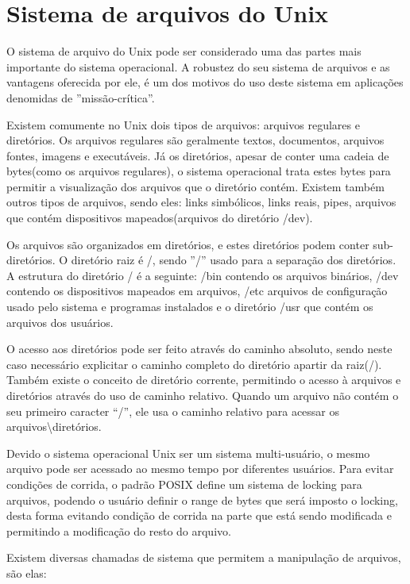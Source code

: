 \chapter{Sistema de arquivos do Unix}

O sistema de arquivo do Unix pode ser considerado uma das partes mais importante do sistema operacional. A robustez do seu sistema de arquivos e as vantagens oferecida por ele, é um dos motivos do uso deste sistema em aplicações denomidas de ''missão-crítica''.

Existem comumente no Unix dois tipos de arquivos: arquivos regulares e diretórios. Os arquivos regulares são geralmente textos, documentos, arquivos fontes, imagens e executáveis. Já os diretórios, apesar de conter uma cadeia de bytes(como os arquivos regulares),  o sistema operacional trata estes bytes para permitir a visualização dos arquivos que o diretório contém. Existem também outros tipos de arquivos, sendo eles: links simbólicos, links reais, pipes, arquivos que contém dispositivos mapeados(arquivos do diretório /dev).

Os arquivos são organizados em diretórios, e estes diretórios podem conter sub-diretórios. O diretório raiz é /, sendo ''/'' usado para a separação dos diretórios. A estrutura do diretório / é a seguinte: /bin contendo os arquivos binários, /dev contendo os dispositivos mapeados em arquivos, /etc arquivos de configuração usado pelo sistema e programas instalados e o diretório /usr que contém os arquivos dos usuários.

O acesso aos diretórios pode ser feito através do caminho absoluto, sendo neste caso necessário explicitar o caminho completo do diretório apartir da raiz(/). Também existe o conceito de diretório corrente, permitindo o acesso à arquivos e diretórios através do uso de caminho relativo. Quando um arquivo não contém o seu primeiro caracter “/”, ele usa o caminho relativo para acessar os arquivos\backslash{}diretórios.

Devido o sistema operacional Unix ser um sistema multi-usuário, o mesmo arquivo pode ser acessado ao mesmo tempo por diferentes usuários. Para evitar condições de corrida, o padrão POSIX define um sistema de locking para arquivos, podendo o usuário definir o range de bytes que será imposto o locking, desta forma evitando condição de corrida na parte que está sendo modificada e permitindo a modificação do resto do arquivo.

Existem diversas chamadas de sistema que permitem a manipulação de arquivos, são elas:

